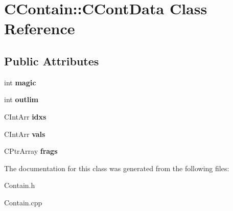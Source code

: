 \hypertarget{class_c_contain_1_1_c_cont_data}{\section{C\-Contain\-:\-:C\-Cont\-Data Class Reference}
\label{class_c_contain_1_1_c_cont_data}
}
\subsection*{Public Attributes}
\begin{DoxyCompactItemize}
\item 
\hypertarget{class_c_contain_1_1_c_cont_data_a8cab4534f6f62313c3ff0ee8dd66ca18}{int {\bfseries magic}}\label{class_c_contain_1_1_c_cont_data_a8cab4534f6f62313c3ff0ee8dd66ca18}

\item 
\hypertarget{class_c_contain_1_1_c_cont_data_ae4a5e021849a5c0edf8c192a9538a27a}{int {\bfseries outlim}}\label{class_c_contain_1_1_c_cont_data_ae4a5e021849a5c0edf8c192a9538a27a}

\item 
\hypertarget{class_c_contain_1_1_c_cont_data_abe03bad79c5591bd52dab484c019ba16}{C\-Int\-Arr {\bfseries idxs}}\label{class_c_contain_1_1_c_cont_data_abe03bad79c5591bd52dab484c019ba16}

\item 
\hypertarget{class_c_contain_1_1_c_cont_data_a4b7a0dba03df44dfd651dc22b5dfcf4a}{C\-Int\-Arr {\bfseries vals}}\label{class_c_contain_1_1_c_cont_data_a4b7a0dba03df44dfd651dc22b5dfcf4a}

\item 
\hypertarget{class_c_contain_1_1_c_cont_data_a30bc6b48fcc4ed66c20218bdba67dfd9}{C\-Ptr\-Array {\bfseries frags}}\label{class_c_contain_1_1_c_cont_data_a30bc6b48fcc4ed66c20218bdba67dfd9}

\end{DoxyCompactItemize}


The documentation for this class was generated from the following files\-:\begin{DoxyCompactItemize}
\item 
Contain.\-h\item 
Contain.\-cpp\end{DoxyCompactItemize}
